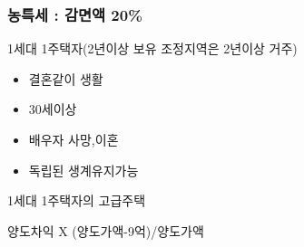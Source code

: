 \documentclass{oblivoir}
\begin{document}
\begin{multicols}{2}
\subsubsection{농특세 : 감면액
20\%}\label{uxb18duxd2b9uxc138-uxac10uxba74uxc561-20}

1세대 1주택자(2년이상 보유 조정지역은 2년이상 거주)

\begin{itemize}
\itemsep1pt\parskip0pt
\item
  결혼같이 생활
\item
  30세이상
\item
  배우자 사망,이혼
\item
  독립된 생계유지가능
\end{itemize}

1세대 1주택자의 고급주택

양도차익 X (양도가액-9억)/양도가액
\end{multicols}
\end{document}
